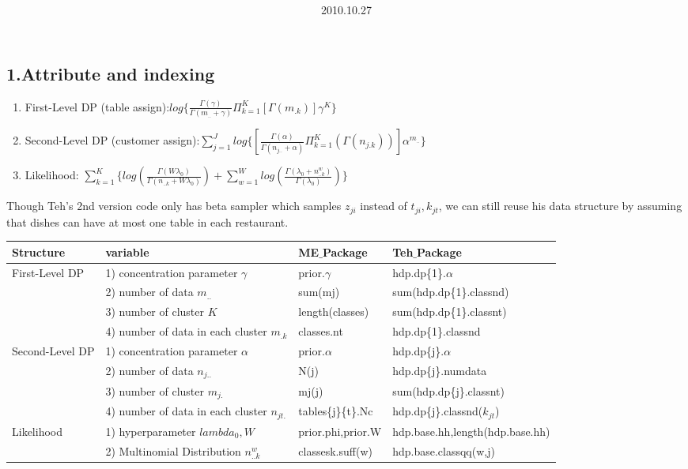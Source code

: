\documentclass{article}
\title{\vspace{0.3in}\textmd{\textbf{\hmwkTitle}}}
\date{2010.10.27}
\author{\textbf{\hmwkAuthorName}}
\begin{document}
\begin{spacing}{1.1}
\maketitle 
\section{1.Attribute and indexing}
\begin{enumerate}
 \item First-Level DP (table assign):$log\{\frac{\Gamma(\gamma)}{\Gamma(m_{..}+\gamma)}\Pi_{k=1}^{K} [\Gamma(m_{.k})] \gamma^{K}\}$
 \item Second-Level DP (customer assign):$\sum_{j=1}^{J}log\{[\frac{\Gamma(\alpha)}{\Gamma(n_{j..}+\alpha)}\Pi_{k=1}^{K}(\Gamma(n_{j.k}))]\alpha^{m_{..}}\}$
 \item Likelihood: $\sum_{k=1}^{K}\{log(\frac{\Gamma(W\lambda_{0})}{\Gamma(n_{..k}+W\lambda_{0})})+\sum_{w=1}^{W}log(\frac{\Gamma(\lambda_{0}+n_{..k}^{w})}{\Gamma(\lambda_{0})})\}$
\end{enumerate}
Though Teh's 2nd version code only has beta sampler which samples $z_{ji}$ instead of $t_{ji},k_{jt}$, we can still reuse his data structure by 
assuming that dishes can have at most one table in each restaurant.\\ 
\begin{table}[t]
\begin{center}
\begin{tabular}{|l|l|l|l|}
\hline
{\bf Structure} &{\bf variable} &{\bf ME$\_$Package}&{\bf Teh$\_$Package} \\ 
\hline 
\multirow{4}{*}{First-Level DP}  & 1) concentration parameter $\gamma$& prior.$\gamma$ & hdp.dp\{1\}.$\alpha$\\
                                 & 2) number of data $m_{..}$&sum(mj)& sum(hdp.dp\{1\}.classnd)\\
      				 & 3) number of cluster $K$&length(classes)& sum(hdp.dp\{1\}.classnt)\\
				 & 4) number of data in each cluster $m_{.k}$&classes.nt& hdp.dp\{1\}.classnd\\   
\hline
\multirow{4}{*}{Second-Level DP} & 1) concentration parameter $\alpha$& prior.$\alpha$ & hdp.dp\{j\}.$\alpha$\\
                                 & 2) number of data $n_{j..}$&N(j)& hdp.dp\{j\}.numdata\\
      				 & 3) number of cluster $m_{j.}$&mj(j)& sum(hdp.dp\{j\}.classnt)\\
				 & 4) number of data in each cluster $n_{jt.}$&tables\{j\}\{t\}.Nc& hdp.dp\{j\}.classnd($k_{jt}$)\\   
\hline
\multirow{2}{*}{Likelihood}      & 1) hyperparameter $lambda_{0},W$ & prior.phi,prior.W & hdp.base.hh,length(hdp.base.hh)\\
                                 & 2) Multinomial Distribution $n^{w}_{..k}$&classes{k}.suff(w)& hdp.base.classqq(w,j)\\
\hline
\end{tabular}
\end{center}
\end{table}


\end{spacing}
\end{document}
